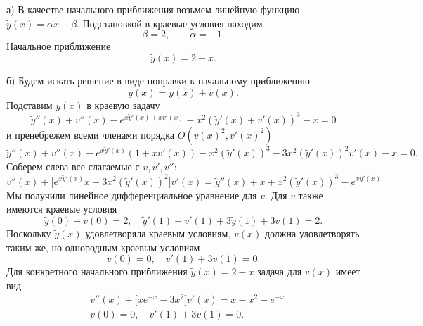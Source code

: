 \documentclass[12pt]{article}
\begin{document}
а) В качестве начального приближения возьмем линейную функцию $\tilde y(x) = \alpha x + \beta$.
Подстановкой в краевые условия находим
\[
\beta = 2, \qquad \alpha = -1.
\]
Начальное приближение
\[
\tilde y(x) = 2 - x.
\]

б) Будем искать решение в виде поправки к начальному приближению
\[
y(x) = \tilde y(x) + v(x).
\]
Подставим $y(x)$ в краевую задачу
\[
\tilde y''(x) + v''(x) - 
e^{x \tilde y'(x) + x v'(x)} - x^2 (\tilde y'(x) + v'(x))^3 - x = 0
\]
и пренебрежем всеми членами порядка $O(v(x)^2, v'(x)^2)$
\[
\tilde y''(x) + v''(x) - 
e^{x \tilde y'(x)}(1 + x v'(x)) - x^2 (\tilde y'(x))^3 - 3 x^2 (\tilde y'(x))^2 v'(x) - x = 0.
\]
Соберем слева все слагаемые с $v, v', v''$:
\[
v''(x) + \big[e^{x \tilde y'(x)}x - 3 x^2 (\tilde y'(x))^2\big] v'(x)  = \tilde y''(x) + x + x^2 (\tilde y'(x))^3 - e^{x y'(x)}
\]
Мы получили линейное дифференциальное уравнение для $v$. Для $v$ также имеются краевые условия
\[
\tilde y(0) + v(0) = 2, \quad \tilde y'(1) + v'(1) + 3 \tilde y(1) + 3 v(1) = 2.
\]
Поскольку $\tilde y(x)$ удовлетворяла краевым условиям, $v(x)$ должна удовлетворять таким же, но однородным краевым условиям
\[
v(0) = 0, \quad v'(1) + 3 v(1) = 0.
\]
Для конкретного начального приближения $\tilde y(x) = 2 - x$ задача для $v(x)$ имеет вид
\begin{align*}
&v''(x) + \big[xe^{-x} - 3 x^2\big] v'(x)  = x - x^2 - e^{-x}\\
&v(0) = 0, \quad v'(1) + 3 v(1) = 0.
\end{align*}
\end{document}

